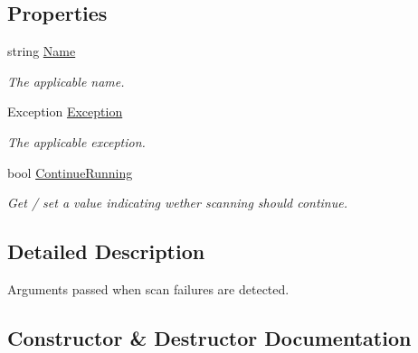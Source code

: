 \subsection*{Properties}
\begin{DoxyCompactItemize}
\item 
string \hyperlink{class_i_c_sharp_code_1_1_sharp_zip_lib_1_1_core_1_1_scan_failure_event_args_a158a4a49c433f7d0adebf4f5080ae9d0}{Name}
\begin{DoxyCompactList}\small\item\em The applicable name. \end{DoxyCompactList}\item 
Exception \hyperlink{class_i_c_sharp_code_1_1_sharp_zip_lib_1_1_core_1_1_scan_failure_event_args_ae0d02d556095208f78a4c1644f3aa15d}{Exception}
\begin{DoxyCompactList}\small\item\em The applicable exception. \end{DoxyCompactList}\item 
bool \hyperlink{class_i_c_sharp_code_1_1_sharp_zip_lib_1_1_core_1_1_scan_failure_event_args_a33ff555d14337a99859499c4f33a93d6}{Continue\+Running}
\begin{DoxyCompactList}\small\item\em Get / set a value indicating wether scanning should continue. \end{DoxyCompactList}\end{DoxyCompactItemize}


\subsection{Detailed Description}
Arguments passed when scan failures are detected. 



\subsection{Constructor \& Destructor Documentation}
\mbox{\label{class_i_c_sharp_code_1_1_sharp_zip_lib_1_1_core_1_1_scan_failure_event_args_a75bc9b55017a0c3c4eba9703707e4485}} 
